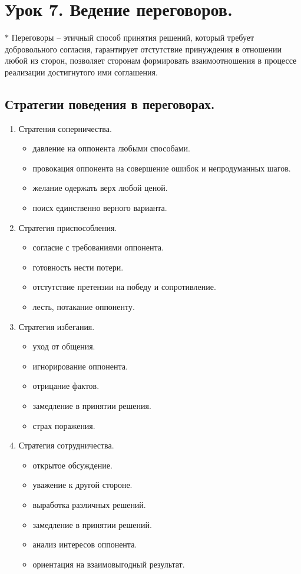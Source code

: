 \documentclass[12pt,a4paper]{report}
\begin{document}
\medskip  
\section*{Урок 7. Ведение переговоров.}
$\ast$ Переговоры -- этичный способ принятия решений, который требует добровольного согласия, гарантирует отстутствие принуждения в отношении любой из сторон, позволяет сторонам формировать взаимоотношения в процессе реализации достигнутого ими соглашения.

\subsection*{Стратегии поведения в переговорах.}
\begin{enumerate}
	\item Стратения соперничества.
	
	\begin{itemize}
		\item давление на оппонента любыми способами.
		\item провокация оппонента на совершение ошибок и непродуманных шагов.
		\item желание одержать верх любой ценой.
		\item поисх единственно верного варианта.
	\end{itemize}

	\item Стратегия приспособления.
	
	\begin{itemize}
		\item согласие с требованиями оппонента.
		\item готовность нести потери.
		\item отстутствие претензии на победу и сопротивление.
		\item лесть, потакание оппоненту.
	\end{itemize}

	\item Стратегия избегания.
	\begin{itemize}
		\item уход от общения.
		\item игнорирование оппонента.
		\item отрицание фактов.
		\item замедление в принятии решения.
		\item страх поражения.
	\end{itemize}

	\item Стратегия сотрудничества.
	\begin{itemize}
		\item открытое обсуждение.
		\item уважение к другой стороне.
		\item выработка различных решений.
		\item замедление в принятии решений.
		\item анализ интересов оппонента.
		\item ориентация на взаимовыгодный результат.
	\end{itemize}


\end{enumerate}
\end{document}

